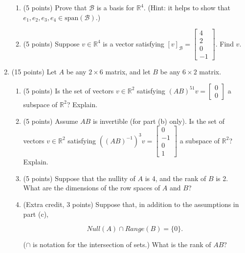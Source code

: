 \documentclass[12 pt]{report}
\begin{document}
\begin{enumerate}
\begin{enumerate}\item (5 points) Prove that $\mathcal{B}$ is a basis for $\mathbb{R}^4$. (Hint: it helps to show that $e_1, e_2, e_3, e_4 \in \text{span}(\mathcal{B})$.)

\vfill 

\item (5 points) Suppose $v \in \mathbb{R}^4$ is a vector satisfying $[v]_\mathcal{B} =  \begin{bmatrix} 4 \\ 2 \\ 0 \\ -1 \end{bmatrix}$. Find $v$. 

\vfill

\end{enumerate}

\newpage

\item (15 points) Let $A$ be any $2 \times 6$ matrix, and let $B$ be any $6 \times 2$ matrix. 

\begin{enumerate} \item (5 points) Is the set of vectors $v \in \mathbb{R}^2$ satisfying $(AB)^{51} v = \begin{bmatrix} 0 \\ 0 \end{bmatrix}$ a subspace of $\mathbb{R}^2$? Explain. 
\vfill
\item (5 points) Assume $AB$ is invertible (for part (b) only). Is the set of vectors $v \in \mathbb{R}^2$ satisfying $((AB)^{-1})^{3}v = \begin{bmatrix} 0 \\ -1 \\ 0 \\ 1 \end{bmatrix}$ a subspace of $\mathbb{R}^2$? Explain. 
\vfill
\item (5 points) Suppose that the nullity of $A$ is 4, and the rank of $B$ is 2. What are the dimensions of the row spaces of $A$ and $B$? 
\vfill
\item (Extra credit, 3 points) Suppose that, in addition to the assumptions in part (c),

\[
Null(A) \cap Range(B) = \{0\}.
\] 

($\cap$ is notation for the intersection of sets.) What is the rank of $AB$?
\vfill
\end{enumerate}
\newpage


\end{enumerate}
\end{document}
